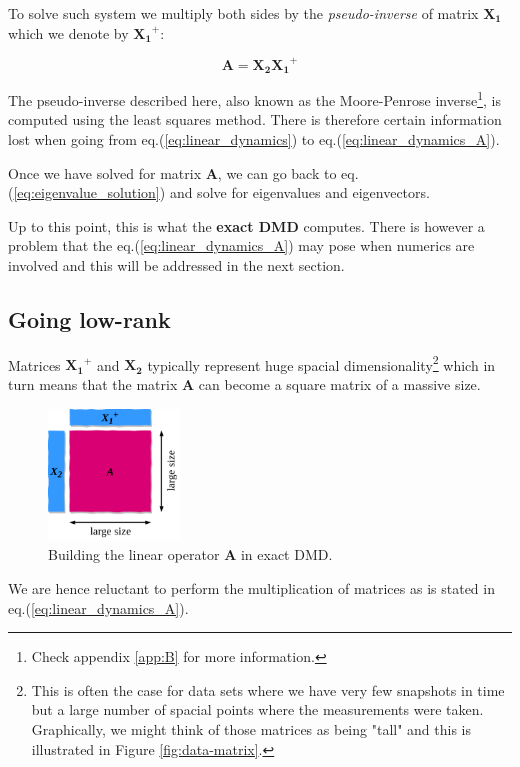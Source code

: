 \documentclass[10pt,twocolumn]{article}
\begin{document}
To solve such system we multiply both sides by the \textit{pseudo-inverse} of matrix $\bm{X_1}$ which we denote by $\bm{X_1}^{+}$:

\begin{equation} \label{eq:linear_dynamics_A}
\bm{A} = \bm{X_2} \bm{X_1}^{+}
\end{equation}

The pseudo-inverse described here, also known as the Moore-Penrose inverse\footnote{Check appendix \ref{app:B} for more information.}, is computed using the least squares method. There is therefore certain information lost when going from eq.(\ref{eq:linear_dynamics}) to eq.(\ref{eq:linear_dynamics_A}).

Once we have solved for matrix $\bm{A}$, we can go back to eq.(\ref{eq:eigenvalue_solution}) and solve for eigenvalues and eigenvectors.

Up to this point, this is what the \textbf{exact DMD} computes. There is however a problem that the eq.(\ref{eq:linear_dynamics_A}) may pose when numerics are involved and this will be addressed in the next section. 

\subsection{Going low-rank}

Matrices $\bm{X_1}^{+}$ and $\bm{X_2}$ typically represent huge spacial dimensionality\footnote{This is often the case for data sets where we have very few snapshots in time but a large number of spacial points where the measurements were taken. Graphically, we might think of those matrices as being "tall" and this is illustrated in Figure \ref{fig:data-matrix}.} which in turn means that the matrix $\bm{A}$ can become a square matrix of a massive size. 

\begin{figure}
\centering\includegraphics[width=3.5cm]{getting-A.png}
\caption{Building the linear operator $\bm{A}$ in exact DMD.}
\label{fig:building-A}
\end{figure}

We are hence reluctant to perform the multiplication of matrices as is stated in eq.(\ref{eq:linear_dynamics_A}). 
\end{document}
